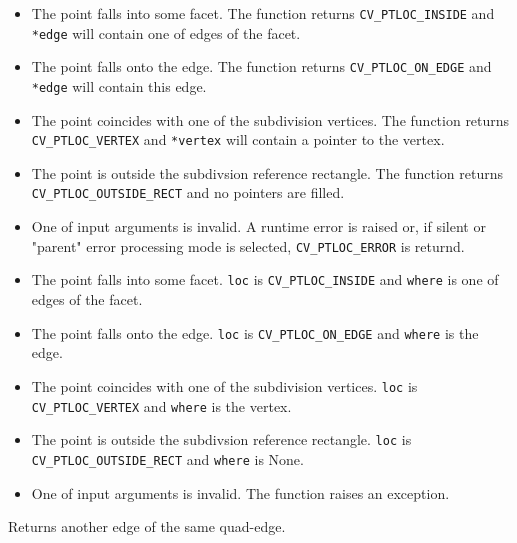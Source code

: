 \ifC
\begin{itemize}
 \item The point falls into some facet. The function returns \texttt{CV\_PTLOC\_INSIDE} and \texttt{*edge} will contain one of edges of the facet.
 \item The point falls onto the edge. The function returns \texttt{CV\_PTLOC\_ON\_EDGE} and \texttt{*edge} will contain this edge.
 \item The point coincides with one of the subdivision vertices. The function returns \texttt{CV\_PTLOC\_VERTEX} and \texttt{*vertex} will contain a pointer to the vertex.
 \item The point is outside the subdivsion reference rectangle. The function returns \texttt{CV\_PTLOC\_OUTSIDE\_RECT} and no pointers are filled.
 \item One of input arguments is invalid. A runtime error is raised or, if silent or "parent" error processing mode is selected, \texttt{CV\_PTLOC\_ERROR} is returnd.
\end{itemize}
\fi

\ifPy
\begin{itemize}
 \item The point falls into some facet.                          \texttt{loc} is \texttt{CV\_PTLOC\_INSIDE} and \texttt{where} is one of edges of the facet.
 \item The point falls onto the edge.                            \texttt{loc} is \texttt{CV\_PTLOC\_ON\_EDGE} and \texttt{where} is the edge.
 \item The point coincides with one of the subdivision vertices. \texttt{loc} is \texttt{CV\_PTLOC\_VERTEX} and \texttt{where} is the vertex.
 \item The point is outside the subdivsion reference rectangle.  \texttt{loc} is \texttt{CV\_PTLOC\_OUTSIDE\_RECT} and \texttt{where} is None.
 \item One of input arguments is invalid. The function raises an exception.
\end{itemize}
\fi

Returns another edge of the same quad-edge.


\begin{description}
\end{description}

